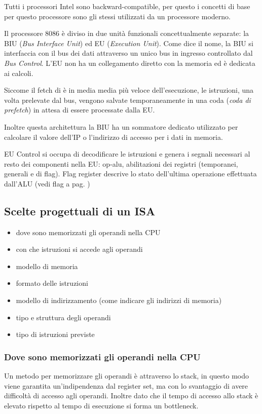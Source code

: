 \documentclass[../template]{subfiles}
\begin{document}
Tutti i processori Intel sono backward-compatible, per questo i concetti di base per questo processore sono gli stessi
utilizzati da un processore moderno.

Il processore 8086 è diviso in due unità funzionali concettualmente separate: la BIU (\textit{Bus Interface Unit}) ed EU
(\textit{Execution Unit}).
Come dice il nome, la BIU si interfaccia con il bus dei dati attraverso un unico bus in ingresso controllato dal
\textit{Bus Control}. L'EU non ha un collegamento diretto con la memoria ed è dedicata ai calcoli.

Siccome il fetch di è in media media più veloce dell'esecuzione, le istruzioni, una volta prelevate dal bus,
vengono salvate temporaneamente in una coda (\textit{coda di prefetch}) in attesa di essere processate dalla EU.

Inoltre questa architettura la BIU ha un sommatore dedicato utilizzato per calcolare il valore dell'IP o l'indirizzo di
accesso per i dati in memoria.

EU Control si occupa di decodificare le istruzioni e genera i segnali necessari al resto dei componenti nella EU:
op-alu, abilitazioni dei registri (temporanei, generali e di flag).
Flag register descrive lo stato dell'ultima operazione effettuata dall'ALU (vedi flag a pag.  \pageref{8086_flags})
\subsection{Scelte progettuali di un ISA}
\begin{itemize}
    \item dove sono memorizzati gli operandi nella CPU
    \item con che istruzioni si accede agli operandi
    \item modello di memoria
    \item formato delle istruzioni
    \item modello di indirizzamento (come indicare gli indirizzi di memoria)
    \item tipo e struttura degli operandi
    \item tipo di istruzioni previste
\end{itemize}

\subsubsection{Dove sono memorizzati gli operandi nella CPU}
Un metodo per memorizzare gli operandi è attraverso lo stack, in questo modo viene garantita un'indipendenza dal
register set, ma con lo svantaggio di avere difficoltà di accesso agli operandi. Inoltre dato che il tempo di accesso allo
stack è elevato rispetto al tempo di esecuzione si forma un bottleneck.
\end{document}
